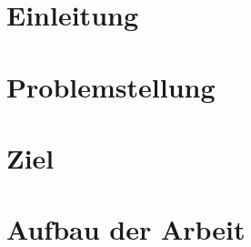 \section{Einleitung}
\label{ch:intro}
\section{Problemstellung}
\label{sec:introContext}

\section{Ziel}
\label{sec:introGoal}

\section{Aufbau der Arbeit}
\label{sec:introSetup}
